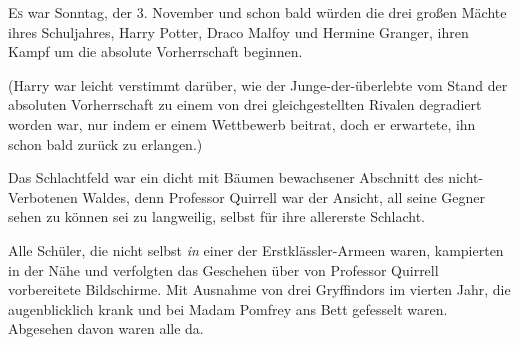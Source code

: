 

\lettrine{E}{s} war Sonntag, der 3. November und schon bald würden die drei großen Mächte ihres Schuljahres, Harry Potter, Draco Malfoy und Hermine Granger, ihren Kampf um die absolute Vorherrschaft beginnen.

(Harry war leicht verstimmt darüber, wie der Junge-der-überlebte vom Stand der absoluten Vorherrschaft zu einem von drei gleichgestellten Rivalen degradiert worden war, nur indem er einem Wettbewerb beitrat, doch er erwartete, ihn schon bald zurück zu erlangen.)

Das Schlachtfeld war ein dicht mit Bäumen bewachsener Abschnitt des nicht-Verbotenen Waldes, denn Professor Quirrell war der Ansicht, all seine Gegner sehen zu können sei zu langweilig, selbst für ihre allererste Schlacht.

Alle Schüler, die nicht selbst \emph{in} einer der Erstklässler-Armeen waren, kampierten in der Nähe und verfolgten das Geschehen über von Professor Quirrell vorbereitete Bildschirme. Mit Ausnahme von drei Gryffindors im vierten Jahr, die augenblicklich krank und bei Madam Pomfrey ans Bett gefesselt waren. Abgesehen davon waren alle da.

